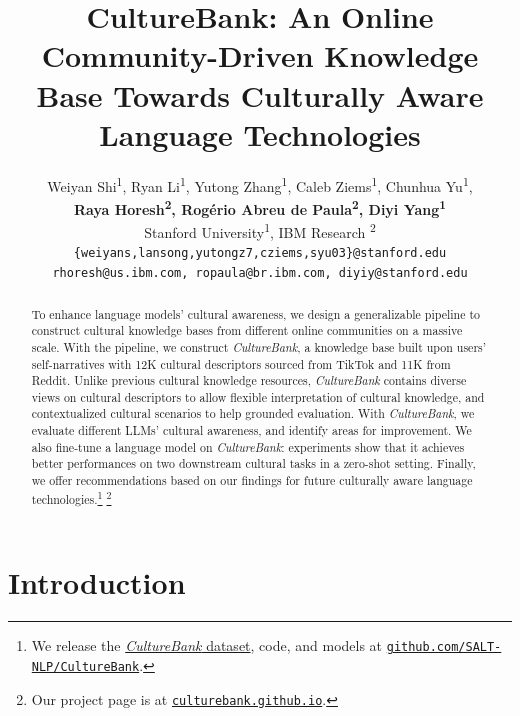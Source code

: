 \documentclass{article} %
\title{\globetitle\textbf{CultureBank\xspace}: An Online Community-Driven Knowledge Base Towards Culturally Aware Language Technologies}
\author{Weiyan Shi\textsuperscript{1}, Ryan Li\textsuperscript{1}, Yutong Zhang\textsuperscript{1}, Caleb Ziems\textsuperscript{1}, Chunhua Yu\textsuperscript{1}, \\ 
\textbf{Raya Horesh\textsuperscript{2}, Rogério Abreu de Paula\textsuperscript{2}, Diyi Yang\textsuperscript{1}} \\
Stanford University\textsuperscript{1}, IBM Research \textsuperscript{2}\\
\texttt{\{weiyans,lansong,yutongz7,cziems,syu03\}@stanford.edu} \\
\texttt{rhoresh@us.ibm.com, ropaula@br.ibm.com, diyiy@stanford.edu}
}
\newcommand{\dataname}{\textit{CultureBank}\xspace}
\begin{document}
\maketitle
\vspace{-1em}
\begin{abstract}
To enhance language models' cultural awareness, we design a generalizable pipeline to construct cultural knowledge bases from different online communities on a massive scale. With the pipeline,  we construct \dataname, a knowledge base built upon users' self-narratives with 12K  cultural descriptors sourced from TikTok and 11K from Reddit. Unlike previous cultural knowledge resources, \dataname contains diverse views on cultural descriptors to allow flexible interpretation of cultural knowledge, and contextualized cultural scenarios to help grounded evaluation. With \dataname, we evaluate different LLMs' cultural awareness, and identify areas for improvement. We also fine-tune a language model on \dataname: experiments show that it achieves better performances on two downstream cultural tasks in a zero-shot setting. Finally, we offer recommendations based on our findings for future culturally aware language technologies.\footnote{We release the \href{https://huggingface.co/datasets/SALT-NLP/CultureBank}{\color{blue}\dataname dataset}, code, and models at  \href{https://github.com/SALT-NLP/CultureBank}{\color{blue}\texttt{github.com/SALT-NLP/CultureBank}}.
} \footnote{Our project page is at \href{https://culturebank.github.io/}{\color{blue}\texttt{culturebank.github.io}}.}
\end{abstract}
\vspace{-1em}
\section{Introduction}
\vspace{-0.5em}
\end{document}
